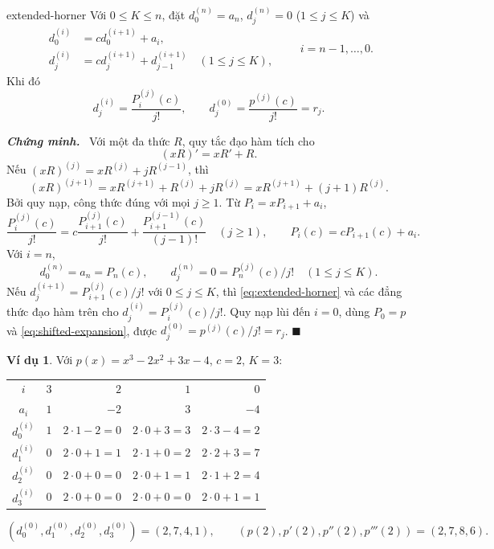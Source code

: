 \documentclass[12pt,a4paper,oneside]{book}
\numberwithin{algorithm}{chapter}
\theoremstyle{definition}
\newtheorem{vidu}{Ví dụ}[chapter]
\newenvironment{chungminh}{\par\medskip\noindent\textbf{\textit{\color{mainblue}Chứng minh.}}\ }{\hfill$\blacksquare$\par\medskip}
\begin{document}
\begin{dinhly}{}{extended-horner}
Với $0\leq K\leq n$, đặt $d_0^{(n)}=a_n$, $d_j^{(n)}=0$ ($1\leq j\leq K$) và
\begin{equation}\label{eq:extended-horner}
 \begin{aligned}
 d_0^{(i)}&=cd_0^{(i+1)}+a_i,\\
 d_j^{(i)}&=cd_j^{(i+1)}+d_{j-1}^{(i+1)}\quad(1\leq j\leq K),
 \end{aligned}
 \qquad i=n-1,\ldots,0.
\end{equation}
Khi đó
\[
 d_j^{(i)}=\frac{P_i^{(j)}(c)}{j!},\qquad
 d_j^{(0)}=\frac{p^{(j)}(c)}{j!}=r_j.
\]
\end{dinhly}
\begin{chungminh}
Với một đa thức $R$, quy tắc đạo hàm tích cho
\[
 (xR)'=xR'+R.
\]
Nếu $(xR)^{(j)}=xR^{(j)}+jR^{(j-1)}$, thì
\[
 (xR)^{(j+1)}
 =xR^{(j+1)}+R^{(j)}+jR^{(j)}
 =xR^{(j+1)}+(j+1)R^{(j)}.
\]
Bởi quy nạp, công thức đúng với mọi $j\geq1$. Từ $P_i=xP_{i+1}+a_i$,
\[
 \frac{P_i^{(j)}(c)}{j!}
 =c\frac{P_{i+1}^{(j)}(c)}{j!}
  +\frac{P_{i+1}^{(j-1)}(c)}{(j-1)!}\quad(j\geq1),
 \qquad P_i(c)=cP_{i+1}(c)+a_i.
\]
Với $i=n$,
\[
 d_0^{(n)}=a_n=P_n(c),\qquad
 d_j^{(n)}=0=P_n^{(j)}(c)/j!\quad(1\leq j\leq K).
\]
Nếu $d_j^{(i+1)}=P_{i+1}^{(j)}(c)/j!$ với $0\leq j\leq K$, thì \eqref{eq:extended-horner} và các đẳng thức đạo hàm trên cho $d_j^{(i)}=P_i^{(j)}(c)/j!$. Quy nạp lùi đến $i=0$, dùng $P_0=p$ và \eqref{eq:shifted-expansion}, được $d_j^{(0)}=p^{(j)}(c)/j!=r_j$.
\end{chungminh}

\begin{vidu}
Với $p(x)=x^3-2x^2+3x-4$, $c=2$, $K=3$:
\begin{center}
\begin{tabular}{c|rrrr}
\toprule
$i$ & $3$ & $2$ & $1$ & $0$\\
$a_i$ & $1$ & $-2$ & $3$ & $-4$\\
\midrule
$d_0^{(i)}$ & $1$ & $2\cdot1-2=0$ & $2\cdot0+3=3$ & $2\cdot3-4=2$\\
$d_1^{(i)}$ & $0$ & $2\cdot0+1=1$ & $2\cdot1+0=2$ & $2\cdot2+3=7$\\
$d_2^{(i)}$ & $0$ & $2\cdot0+0=0$ & $2\cdot0+1=1$ & $2\cdot1+2=4$\\
$d_3^{(i)}$ & $0$ & $2\cdot0+0=0$ & $2\cdot0+0=0$ & $2\cdot0+1=1$\\
\bottomrule
\end{tabular}
\end{center}
\[
 (d_0^{(0)},d_1^{(0)},d_2^{(0)},d_3^{(0)})=(2,7,4,1),\qquad
 (p(2),p'(2),p''(2),p'''(2))=(2,7,8,6).
\]
\end{vidu}
\end{document}

